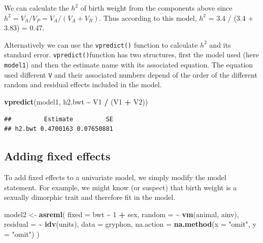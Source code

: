 \documentclass[
  12pt,
]{book}
\newenvironment{Shaded}{\begin{snugshade}}{\end{snugshade}}
\newcommand{\DataTypeTok}[1]{\textcolor[rgb]{0.13,0.29,0.53}{#1}}
\newcommand{\DecValTok}[1]{\textcolor[rgb]{0.00,0.00,0.81}{#1}}
\newcommand{\KeywordTok}[1]{\textcolor[rgb]{0.13,0.29,0.53}{\textbf{#1}}}
\newcommand{\NormalTok}[1]{#1}
\newcommand{\OperatorTok}[1]{\textcolor[rgb]{0.81,0.36,0.00}{\textbf{#1}}}
\newcommand{\StringTok}[1]{\textcolor[rgb]{0.31,0.60,0.02}{#1}}
\begin{document}
We can calculate the \(h^2\) of birth weight from the components above since \(h^2 = V_A/V_P = V_A/(V_A+V_R)\). Thus according to this model, \(h^2\) = 3.4 / (3.4 + 3.83) = 0.47.

Alternatively we can use the \texttt{vpredict()} function to calculate \(h^2\) and its standard error. \texttt{vpredict()}function has two structures, first the model used (here \texttt{model1}) and then the estimate name with its associated equation. The equation used different \texttt{V} and their associated numbers depend of the order of the different random and residual effects included in the model.

\begin{Shaded}
\begin{Highlighting}[]
\KeywordTok{vpredict}\NormalTok{(model1, h2.bwt }\OperatorTok{\textasciitilde{}}\StringTok{ }\NormalTok{V1 }\OperatorTok{/}\StringTok{ }\NormalTok{(V1 }\OperatorTok{+}\StringTok{ }\NormalTok{V2))}
\end{Highlighting}
\end{Shaded}

\begin{verbatim}
##         Estimate         SE
## h2.bwt 0.4700163 0.07650881
\end{verbatim}

\hypertarget{adding-fixed-effects}{%
\subsection{Adding fixed effects}\label{adding-fixed-effects}}

To add fixed effects to a univariate model, we simply modify the model statement. For example, we might know (or suspect) that birth weight is a sexually dimorphic trait and therefore fit in the model.

\begin{Shaded}
\begin{Highlighting}[]
\NormalTok{model2 \textless{}{-}}\StringTok{ }\KeywordTok{asreml}\NormalTok{(}
  \DataTypeTok{fixed =}\NormalTok{ bwt }\OperatorTok{\textasciitilde{}}\StringTok{ }\DecValTok{1} \OperatorTok{+}\StringTok{ }\NormalTok{sex,}
  \DataTypeTok{random =} \OperatorTok{\textasciitilde{}}\StringTok{ }\KeywordTok{vm}\NormalTok{(animal, ainv),}
  \DataTypeTok{residual =} \OperatorTok{\textasciitilde{}}\StringTok{ }\KeywordTok{idv}\NormalTok{(units),}
  \DataTypeTok{data =}\NormalTok{ gryphon,}
  \DataTypeTok{na.action =} \KeywordTok{na.method}\NormalTok{(}\DataTypeTok{x =} \StringTok{"omit"}\NormalTok{, }\DataTypeTok{y =} \StringTok{"omit"}\NormalTok{)}
\NormalTok{)}
\end{Highlighting}
\end{Shaded}
\end{document}
